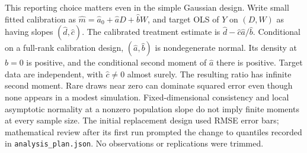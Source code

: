 \documentclass[11pt]{article}
\begin{document}
This reporting choice matters even in the simple Gaussian design. Write small fitted calibration as $\widehat m=\widehat a_0+\widehat a D+\widehat b W$, and target OLS of $Y$ on $(D,W)$ as having slopes $(\widehat d,\widehat c)$. The calibrated treatment estimate is $\widehat d-\widehat c\widehat a/\widehat b$. Conditional on a full-rank calibration design, $(\widehat a,\widehat b)$ is nondegenerate normal. Its density at $\widehat b=0$ is positive, and the conditional second moment of $\widehat a$ there is positive. Target data are independent, with $\widehat c\ne0$ almost surely. The resulting ratio has infinite second moment. Rare draws near zero can dominate squared error even though none appears in a modest simulation. Fixed-dimensional consistency and local asymptotic normality at a nonzero population slope do not imply finite moments at every sample size. The initial replacement design used RMSE error bars; mathematical review after its first run prompted the change to quantiles recorded in \texttt{analysis\_plan.json}. No observations or replications were trimmed.



\end{document}

